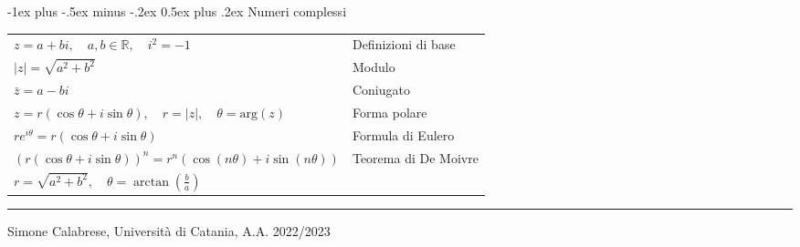 \documentclass[a4paper,10pt,landscape]{article}
\makeatletter
\renewcommand{\section}{\@startsection{section}{1}{0mm}%
                                {-1ex plus -.5ex minus -.2ex}%
                                {0.5ex plus .2ex}%
                                {\normalfont\large\bfseries}}
\makeatother
\begin{document}
\begin{multicols}{3}
\section{Numeri complessi} 
\vspace{1mm}
\begin{tabular}{l l}
    $ z = a + bi, \quad a, b \in \mathbb{R}, \quad i^2 = -1 $ & Definizioni di base \\
    $ |z| = \sqrt{a^2 + b^2} $ & Modulo \\
    $ \bar{z} = a - bi $ & Coniugato \\
    $ z = r(\cos \theta + i \sin \theta), \quad r = |z|, \quad \theta = \text{arg}(z) $ & Forma polare \\
    $ re^{i\theta} = r(\cos \theta + i \sin \theta) $ &   Formula di Eulero \\
    $ (r(\cos \theta + i \sin \theta))^n = r^n (\cos (n\theta) + i \sin (n\theta))$ & Teorema di De Moivre \\
    $ r = \sqrt{a^2 + b^2}, \quad \theta = \arctan\left(\frac{b}{a}\right) $ \\
\end{tabular}

\vspace{3mm}

\vfill
\hrule
\smallskip

\noindent Simone Calabrese, Università di Catania, A.A. 2022/2023 \hfill  \href{http://simonecalabrese.com/}{\color{blue}{simonecalabrese.com}}\\

\end{multicols}
\end{document}
